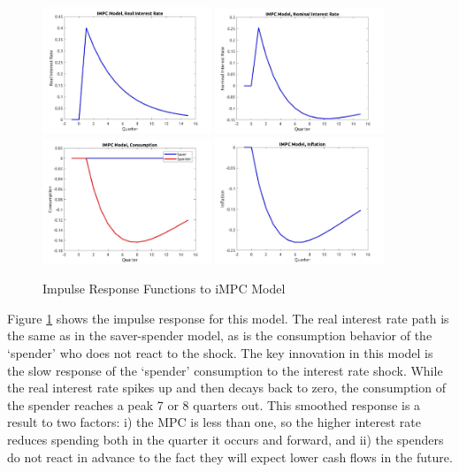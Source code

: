 \documentclass[AER]{AEA}
\begin{document}
\begin{figure}
	\includegraphics[width=0.45\textwidth]{../Code/Dynare/Figures/RealRateIMPC.jpg}
	\includegraphics[width=0.45\textwidth]{../Code/Dynare/Figures/NominalRateIMPC.jpg}
	\includegraphics[width=0.45\textwidth]{../Code/Dynare/Figures/ConsumptionIMPC.jpg}
	\includegraphics[width=0.45\textwidth]{../Code/Dynare/Figures/InflationIMPC.jpg}
	\caption{Impulse Response Functions to iMPC Model}
	\label{fig:IFRIMPC}
\end{figure}

Figure \ref{fig:IFRIMPC} shows the impulse response for this model. The real interest rate path is the same as in the saver-spender model, as is the consumption behavior of the `spender' who does not react to the shock. The key innovation in this model is the slow response of the `spender' consumption to the interest rate shock. While the real interest rate spikes up and then decays back to zero, the consumption of the spender reaches a peak 7 or 8 quarters out. This smoothed response is a result to two factors: i) the MPC is less than one, so the higher interest rate reduces spending both in the quarter it occurs and forward, and ii) the spenders do not react in advance to the fact they will expect lower cash flows in the future.
\end{document}
